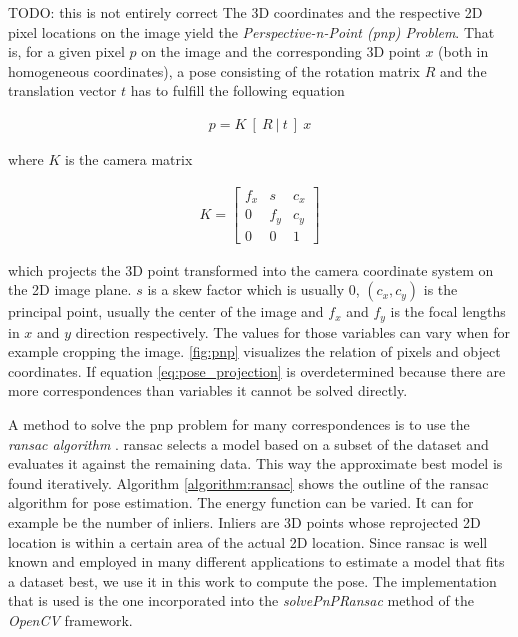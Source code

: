 TODO: this is not entirely correct
The 3D coordinates and the respective 2D pixel locations on the image yield the \textit{Perspective-n-Point (\gls{pnp}) Problem}. That is, for a given pixel $p$ on the image and the corresponding 3D point $x$ (both in homogeneous coordinates), a pose consisting of the rotation matrix $R$ and the translation vector $t$ has to fulfill the following equation

\begin{align}
 p = K \ [ \ R \ | \ t \ ] \ x \label{eq:pose_projection}
\end{align} 

where $K$ is the camera matrix

\begin{align}
K = \begin{bmatrix}
f_x & s & c_x \\
0 & f_y & c_y \\
0 & 0 & 1 
\end{bmatrix}
\end{align}

which projects the 3D point transformed into the camera coordinate system on the 2D image plane. $s$ is a skew factor which is usually $0$, $(c_x, c_y)$ is the principal point, usually the center of the image and $f_x$ and $f_y$ is the focal lengths in $x$ and $y$ direction respectively. The values for those variables can vary when for example cropping the image. \fig \ref{fig:pnp} visualizes the relation of pixels and object coordinates. If equation \ref{eq:pose_projection} is overdetermined because there are more correspondences than variables it cannot be solved directly.

A method to solve the \gls{pnp} problem for many correspondences is to use the \textit{\gls{ransac} algorithm} \cite{ransac}. \gls{ransac} selects a model based on a subset of the dataset and evaluates it against the remaining data. This way the approximate best model is found iteratively. Algorithm \ref{algorithm:ransac} shows the outline of the \gls{ransac} algorithm for pose estimation. The energy function can be varied. It can for example be the number of inliers. Inliers are 3D points whose reprojected 2D location is within a certain area of the actual 2D location. Since \gls{ransac} is well known and employed in many different applications to estimate a model that fits a dataset best, we use it in this work to compute the pose. The implementation that is used is the one incorporated into the \textit{solvePnPRansac} method of the \textit{OpenCV} \cite{opencv} framework. 

